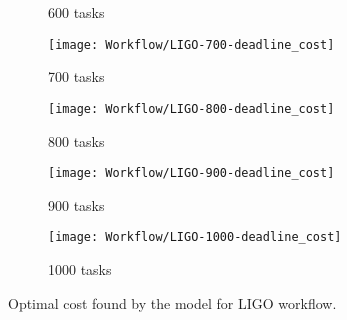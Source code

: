 {\begin{figure}[tb]
\begin{subfigure}[b]{0.45\textwidth}
         \caption{600 tasks}
       \end{subfigure}
       \begin{subfigure}[b]{0.45\textwidth}
         \texttt{[image: Workflow/LIGO-700-deadline\_cost]}
         \caption{700 tasks}
       \end{subfigure}
       \begin{subfigure}[b]{0.45\textwidth}
         \texttt{[image: Workflow/LIGO-800-deadline\_cost]}
         \caption{800 tasks}
       \end{subfigure}
       \begin{subfigure}[b]{0.45\textwidth}
         \texttt{[image: Workflow/LIGO-900-deadline\_cost]}
         \caption{900 tasks}
       \end{subfigure}
       \begin{subfigure}[b]{0.45\textwidth}
         \texttt{[image: Workflow/LIGO-1000-deadline\_cost]}
         \caption{1000 tasks}
       \end{subfigure}
       \caption{Optimal cost found by the model for LIGO workflow.}
       \label{fig:workflow:ligo}
     \end{figure}
     
}
